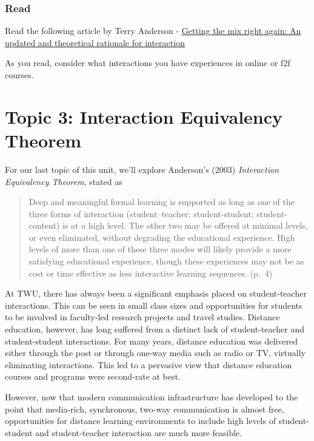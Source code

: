 \documentclass[
]{book}
\begin{document}
\hypertarget{read}{%
\subsubsection*{Read}\label{read}}

Read the following article by Terry Anderson
- \href{http://www.irrodl.org/index.php/irrodl/article/view/149/230}{Getting the mix right again: An updated and theoretical rationale for interaction}

As you read, consider what interactions you have experiences in online or f2f courses.

\hypertarget{topic-3-interaction-equivalency-theorem}{%
\section*{Topic 3: Interaction Equivalency Theorem}\label{topic-3-interaction-equivalency-theorem}}

For our last topic of this unit, we'll explore Anderson's (2003) \emph{Interaction Equivalency Theorem}, stated as

\begin{quote}
Deep and meaningful formal learning is supported as long as one of the three forms of interaction (student--teacher; student-student; student-content) is at a high level. The other two may be offered at minimal levels, or even eliminated, without degrading the educational experience.
High levels of more than one of these three modes will likely provide a more satisfying educational experience, though these experiences may not be as cost or time effective as less interactive learning sequences. (p.~4)
\end{quote}

At TWU, there has always been a significant emphasis placed on student-teacher interactions. This can be seen in small class sizes and opportunities for students to be involved in faculty-led research projects and travel studies. Distance education, however, has long suffered from a distinct lack of student-teacher and student-student interactions. For many years, distance education was delivered either through the post or through one-way media such as radio or TV, virtually eliminating interactions. This led to a pervasive view that distance education courses and programs were second-rate at best.

However, now that modern communication infrastructure has developed to the point that media-rich, synchronous, two-way communication is almost free, opportunities for distance learning environments to include high levels of student-student and student-teacher interaction are much more feasible.
\end{document}
